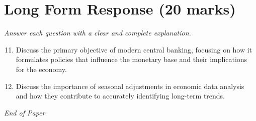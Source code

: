 \documentclass[12pt]{article}
\begin{document}
\section*{Long Form Response (20 marks)}
\textit{Answer each question with a clear and complete explanation.}
\begin{enumerate}[label=\arabic*.]
\setcounter{enumi}{10}
\item Discuss the primary objective of modern central banking, focusing on how it formulates
policies that influence the monetary base and their implications for the economy.
\item Discuss the importance of seasonal adjustments in economic data analysis and how they
contribute to accurately identifying long-term trends.
\end{enumerate}

\vfill
\noindent\textit{End of Paper}
\end{document}
